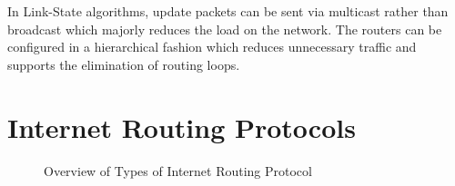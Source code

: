 In Link-State algorithms, update packets can be sent via multicast rather than broadcast which majorly reduces the load on the network. The routers can be configured in a hierarchical fashion which reduces unnecessary traffic and supports the elimination of routing loops.

\section{Internet Routing Protocols}
\begin{figure}[H]
    \centering
    
    \caption{Overview of Types of Internet Routing Protocol}    
\end{figure}